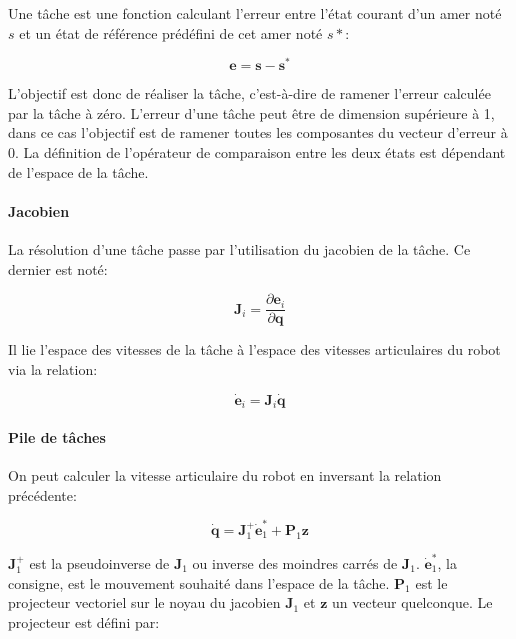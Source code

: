 \begin{mydef}
Une tâche est une fonction calculant l'erreur entre l'état courant
d'un amer noté $s$ et un état de référence prédéfini de cet amer
noté $s*$:

\begin{equation}
  \mathbf{e} = \mathbf{s} - \mathbf{s}^{*}
\end{equation}

L'objectif est donc de réaliser la tâche, c'est-à-dire de ramener
l'erreur calculée par la tâche à zéro. L'erreur d'une tâche peut être
de dimension supérieure à 1, dans ce cas l'objectif est de ramener
toutes les composantes du vecteur d'erreur à $0$. La définition de
l'opérateur de comparaison entre les deux états est dépendant de
l'espace de la tâche.
\end{mydef}

\paragraph{Jacobien}

La résolution d'une tâche passe par l'utilisation du jacobien de la
tâche. Ce dernier est noté:

\begin{equation}
  \mathbf{J}_i = \frac{\partial \mathbf{e}_i}{\partial \mathbf{q}}
\end{equation}

Il lie l'espace des vitesses de la tâche à l'espace des vitesses
articulaires du robot via la relation:

\begin{equation}
  \dot{\mathbf{e}}_i = \mathbf{J}_i \dot{\mathbf{q}}
\end{equation}


\paragraph{Pile de tâches}

On peut calculer la vitesse articulaire du robot en inversant la
relation précédente:

\begin{equation}
  \dot{\mathbf{q}} = \mathbf{J}_1^{+} \dot{\mathbf{e}}_1^{*} + \mathbf{P}_1 \mathbf{z}
\end{equation}

$\mathbf{J}_1^{+}$ est la pseudoinverse de $\mathbf{J}_1$ ou inverse
des moindres carrés de $\mathbf{J}_1$. $\dot{\mathbf{e}}_1^{*}$, la
consigne, est le mouvement souhaité dans l'espace de la
tâche. $\mathbf{P}_1$ est le projecteur vectoriel sur le noyau du
jacobien $\mathbf{J}_1$ et $\mathbf{z}$ un vecteur quelconque. Le
projecteur est défini par:

